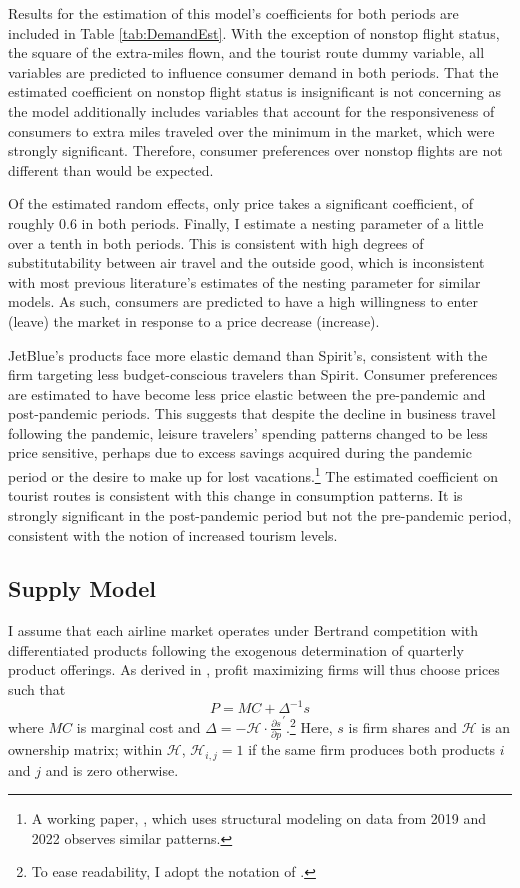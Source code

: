 \documentclass{article}
\begin{document}
    Results for the estimation of this model's coefficients for both periods are included in Table \ref{tab:DemandEst}. With the exception of nonstop flight status, the square of the extra-miles flown, and the tourist route dummy variable, all variables are predicted to influence consumer demand in both periods. That the estimated coefficient on nonstop flight status is insignificant is not concerning as the model additionally includes variables that account for the responsiveness of consumers to extra miles traveled over the minimum in the market, which were strongly significant. Therefore, consumer preferences over nonstop flights are not different than would be expected.  
    
    Of the estimated random effects, only price takes a significant coefficient, of roughly $0.6$ in both periods. Finally, I estimate a nesting parameter of a little over a tenth in both periods. This is consistent with high degrees of substitutability between air travel and the outside good, which is inconsistent with most previous literature's estimates of the nesting parameter for similar models. As such, consumers are predicted to have a high willingness to enter (leave) the market in response to a price decrease (increase).

     JetBlue's products face more elastic demand than Spirit's, consistent with the firm targeting less budget-conscious travelers than Spirit. Consumer preferences are estimated to have become less price elastic between the pre-pandemic and post-pandemic periods. This suggests that despite the decline in business travel following the pandemic, leisure travelers' spending patterns changed to be less price sensitive, perhaps due to excess savings acquired during the pandemic period or the desire to make up for lost vacations.\footnote{A working paper, \citet{ewen_zoom_2023}, which uses structural modeling on data from 2019 and 2022 observes similar patterns.}  The estimated coefficient on tourist routes is consistent with this change in consumption patterns.  It is strongly significant in the post-pandemic period but not the pre-pandemic period, consistent with the notion of increased tourism levels. 
    
		
	\subsection{Supply Model}
	\label{sec:Analysis_Supply}
	I assume that each airline market operates under Bertrand competition with differentiated products following the exogenous determination of quarterly product offerings. As derived in \citet{berry_automobile_1995}, profit maximizing firms will thus choose prices such that \[P = MC + \Delta^{-1} s\] where $MC$ is marginal cost and $\Delta = - \mathcal{H} \cdot \frac{\partial s}{\partial p}^{'}$.\footnote{To ease readability, I adopt the notation of \citet{conlon_best_2020}.} Here, $s$ is firm shares and $\mathcal{H}$ is an ownership matrix; within $\mathcal{H}$, $\mathcal{H}_{i,j} = 1$ if the same firm produces both products $i$ and $j$ and is zero otherwise.
\end{document}
